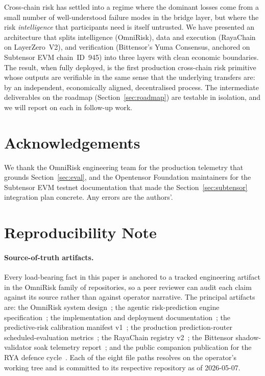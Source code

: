 \documentclass[11pt,a4paper]{article}
\begin{document}
Cross-chain risk has settled into a regime where the dominant losses come from a small
number of well-understood failure modes in the bridge layer, but where the risk
\emph{intelligence} that participants need is itself untrusted. We have presented an
architecture that splits intelligence (OmniRisk), data and execution (RayaChain on
LayerZero~V2), and verification (Bittensor's Yuma Consensus, anchored on Subtensor EVM
chain~ID~945) into three layers with clean economic boundaries. The result, when fully
deployed, is the first production cross-chain risk primitive whose outputs are
verifiable in the same sense that the underlying transfers are: by an independent,
economically aligned, decentralised process. The intermediate deliverables on the
roadmap (Section~\ref{sec:roadmap}) are testable in isolation, and we will report on
each in follow-up work.

\section*{Acknowledgements}
We thank the OmniRisk engineering team for the production telemetry that grounds
Section~\ref{sec:eval}, and the Opentensor Foundation maintainers for the Subtensor
EVM testnet documentation that made the Section~\ref{sec:subtensor} integration plan
concrete. Any errors are the authors'.

\section*{Reproducibility Note}

\paragraph{Source-of-truth artifacts.} Every load-bearing fact in this paper is
anchored to a tracked engineering artifact in the OmniRisk family of
repositories, so a peer reviewer can audit each claim against its source rather
than against operator narrative. The principal artifacts are: the OmniRisk system
design~\cite{omnirisk2026systemdesign}; the agentic risk-prediction engine
specification~\cite{omnirisk2026agentic}; the implementation and deployment
documentation~\cite{omnirisk2026deploy}; the predictive-risk calibration
manifest v1~\cite{omnirisk2026calibration}; the production prediction-router
scheduled-evaluation metrics~\cite{omnirisk2026predmetrics}; the RayaChain
registry v2~\cite{rayachain2026registry}; the Bittensor shadow-validator soak
telemetry report~\cite{omnirisk2026soak}; and the public companion publication
for the RYA defence cycle~\cite{omnirisk2026defending}. Each of the eight file
paths resolves on the operator's working tree and is committed to its
respective repository as of 2026-05-07.
\end{document}
